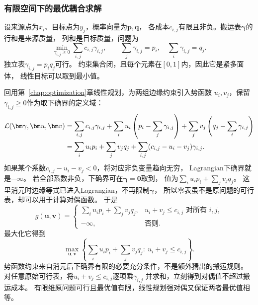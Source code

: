 \subsubsection{有限空间下的最优耦合求解}
\label{sec:information-finite-transport}

设来源点为\(x_i\)、目标点为\(y_j\)，概率向量为\(\bm p,\bm q\)，
各成本\(c_{i,j}\)有限且非负。搬运表\(\bm\gamma\)的行和是来源质量，
列和是目标质量，问题为
\[
  \min_{\gamma_{i,j}\geq0}\sum_{i,j}c_{i,j}\gamma_{i,j},
  \qquad \sum_j\gamma_{i,j}=p_i,\quad\sum_i\gamma_{i,j}=q_j.
\]
独立表\(\gamma_{i,j}=p_iq_j\)可行。
约束集合闭，且每个元素在\([0,1]\)内，因此它是紧多面体，
线性目标可以取到最小值。

回用第~\ref{chap:optimization}章线性规划，为两组边缘约束引入势函数
\(u_i,v_j\)，保留\(\gamma_{i,j}\geq0\)作为取下确界的定义域：
\begin{align}
  \mathcal L(\bm\gamma,\bm u,\bm v)
  &=\sum_{i,j}c_{i,j}\gamma_{i,j}
    +\sum_i u_i\left(p_i-\sum_j\gamma_{i,j}\right)
    +\sum_j v_j\left(q_j-\sum_i\gamma_{i,j}\right)\notag\\
  &=\sum_i u_ip_i+\sum_jv_jq_j
    +\sum_{i,j}(c_{i,j}-u_i-v_j)\gamma_{i,j}.
  \label{eq:information-discrete-ot-lagrangian}
\end{align}
如果某个系数\(c_{i,j}-u_i-v_j<0\)，将对应非负变量趋向无穷，
Lagrangian下确界就是\(-\infty\)。
若全部系数非负，下确界可在\(\bm\gamma=\bm0\)取到，
值为\(\sum_i u_ip_i+\sum_jv_jq_j\)。
这里消元时边缘等式已进入Lagrangian，不再限制\(\bm\gamma\)，
所以零表虽不是原问题的可行表，却可以用于计算对偶函数。
于是
\[
  g(\bm u,\bm v)=
  \begin{cases}
    \sum_i u_ip_i+\sum_jv_jq_j,&u_i+v_j\leq c_{i,j}\text{ 对所有 }i,j,\\
    -\infty,&\text{否则}.
  \end{cases}
\]
最大化它得到
\begin{equation}
  \max_{\bm u,\bm v}
  \left\{\sum_i u_ip_i+\sum_jv_jq_j:\ u_i+v_j\leq c_{i,j}\right\}.
  \label{eq:information-discrete-ot-dual}
\end{equation}
势函数约束来自消元后下确界有限的必要充分条件，不是额外猜出的搬运规则。
对任意原始可行表，将\(u_i+v_j\leq c_{i,j}\)逐项乘\(\gamma_{i,j}\)
并求和，立刻得到对偶值不超过搬运成本。
有限维原问题可行且最优值有限，线性规划强对偶又保证两者最优值相等。

